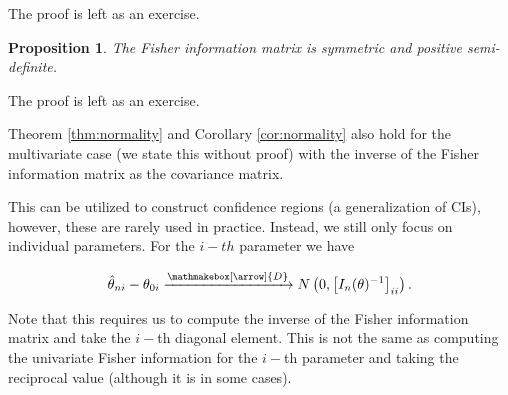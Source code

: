 \documentclass{book}
\theoremstyle{plain}%
\newtheorem{proposition}{Proposition}[section]
\theoremstyle{definition}
\newlength{\arrow}
\newcommand*{\myrightarrow}[1]{\xrightarrow{\mathmakebox[\arrow]{#1}}}
\begin{document}
The proof is left as an exercise.

\begin{proposition}
The Fisher information matrix is symmetric and positive semi-definite.
\label{prop:fipsd}
\end{proposition}

The proof is left as an exercise.

Theorem \ref{thm:normality} and Corollary \ref{cor:normality} also hold for the multivariate case (we state this without proof) with the inverse of the Fisher information matrix as the covariance matrix.

This can be utilized to construct confidence regions (a generalization of CIs), however, these are rarely used in practice. Instead, we still only focus on individual parameters. For the $i-th$ parameter we have

$$\hat{\theta}_{ni} - \theta_{0i} \myrightarrow{D} N\left(0, \left[I_n(\theta)^{-1}\right]_{ii}\right).$$

Note that this requires us to compute the inverse of the Fisher information matrix and take the $i-$th diagonal element. This is not the same as computing the univariate Fisher information for the $i-$th parameter and taking the reciprocal value (although it is in some cases).
\end{document}
